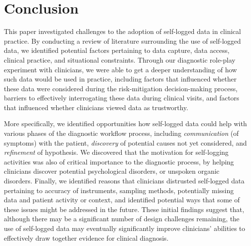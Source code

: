 \documentclass{sigchi}
\begin{document}
\section{Conclusion}






This paper investigated challenges to the adoption of self-logged data in clinical practice. By conducting a review of literature surrounding the use of self-logged data, we identified potential factors pertaining to data capture, data access, clinical practice, and situational constraints.  Through our diagnostic role-play experiment with clinicians, we were able to get a deeper understanding of how such data would be used in practice, including factors that influenced whether these data were considered during the risk-mitigation decision-making process, barriers to effectively interrogating  these data during clinical visits, and factors that influenced whether clinicians viewed data as trustworthy. 

More specifically, we identified opportunities how self-logged data could help with various phases of the diagnostic workflow process, including \emph{communication} (of symptoms) with the patient,  \emph{discovery} of potential causes not yet considered, and \emph{refinement} of hypothesis.  We discovered that the motivation for self-logging activities was also of critical importance to the diagnostic process, by helping clinicians discover potential psychological disorders, or unspoken organic disorders. Finally, we identified reasons that clinicians distrusted self-logged data pertaining to accuracy of instruments, sampling methods, potentially missing data and patient activity or context, and identified potential ways that some of these issues might be addressed in the future. These initial findings suggest that, although there may be a significant number of design challenges remaining, the use of self-logged data may eventually significantly improve clinicians' abilities to effectively draw together evidence for clinical diagnosis. %
\end{document}

